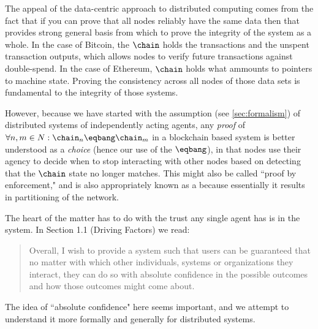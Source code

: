\documentclass[twocolumn,showpacs,
  nofootinbib,aps,superscriptaddress,
  eqsecnum,prd,notitlepage,showkeys,10pt]{revtex4-1}
\begin{document}
The appeal of the data-centric approach to distributed computing comes from the fact that if you can prove that all nodes reliably have the same data then that provides strong general basis from which to prove the integrity of the system as a whole.  In the case of Bitcoin, the $\chain$ holds the transactions and the unspent transaction outputs, which allows nodes to verify future transactions against double-spend. In the case of Ethereum, $\chain$ holds what ammounts to pointers to machine state. Proving the consistency across all nodes of those data sets is fundamental to the integrity of those systems.

However, because we have started with the assumption (see \ref{sec:formalism}) of distributed systems of independently acting agents, any \textit{proof} of  $\forall n,m \in N: \chain_n\eqbang\chain_m$ in a blockchain based system is better understood as a \textit{choice} (hence our use of the $\eqbang$),  in that nodes use their agency to decide when to stop interacting with other nodes based on detecting that the $\chain$ state no longer matches.  This might also be called  ``proof by enforcement," and is also appropriately known as a  because essentially it results in partitioning of the network.

The heart of the matter has to do with the trust any single agent has is in the system.  In \cite{yellowpaper} Section 1.1 (Driving Factors) we read:
\begin{quote}
Overall, I wish to provide a system such that users can be guaranteed that no matter with which other individuals, systems or organizations they interact, they can do so with absolute confidence in the possible outcomes and how those outcomes might come about.
\end{quote}

The idea of ``absolute confidence" here seems important, and we attempt to understand it more formally and generally for distributed systems.
\end{document}
